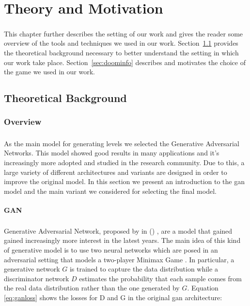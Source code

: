 \chapter{Theory and Motivation}
\label{ch:theory}
\paragraph{} This chapter further describes the setting of our work and gives the reader some overview of the tools and techniques we used in our work. Section~\ref{sec:gantheory} provides the theoretical background necessary to better understand the setting in which our work take place. Section~\ref{sec:doominfo} describes and motivates the choice of the game we used in our work. 

\section{Theoretical Background}
\label{sec:gantheory}
\subsection{Overview}
\paragraph{} As the main model for generating levels we selected the Generative Adversarial Networks. This model showed good results in many applications and it's increasingly more adopted and studied in the research community. Due to this, a large variety of different architectures and variants are designed in order to improve the original model. In this section we present an introduction to the \gls{gan} model and the main variant we considered for selecting the final model. 

\subsubsection{GAN}
\label{sec:introgan}
\paragraph{} Generative Adversarial Network, proposed by \citeauthor{gan} in  (\citeyear{gan}) \cite{gan}, are a model that gained gained increasingly more interest in the latest years. The main idea of this kind of generative model is to use two neural networks which are posed in an adversarial setting that models a two-player Minimax Game \cite[p.~276]{minimax}. In particular, a generative network $G$ is trained to capture the data distribution while a discriminator network $D$ estimates the probability that each sample comes from the real data distribution rather than the one generated by $G$. 
Equation \ref{eq:ganloss} shows the losses for D and G in the original \gls{gan} architecture\cite{gan}:

